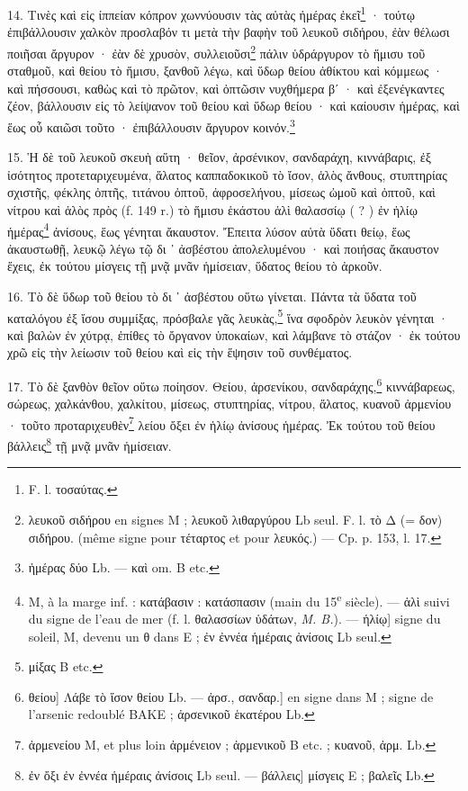 \documentclass[a4paper, 11pt, oneside, polutonikogreek, french]{article}
\begin{document}
14. Τινὲς καὶ εἰς ίππείαν κόπρον χωννύουσιν τὰς αὐτὰς ἠμέρας ἐκεῖ\footnote{F. l. τοσαύτας.} · τούτῳ ἐπιβάλλουσιν χαλκὸν προσλαβόν τι μετὰ τὴν βαφὴν τοῦ λευκοῦ σιδήρου, ἐὰν θέλωσι ποιῆσαι ἄργυρον · ἐὰν δὲ χρυσὸν, συλλειοῦσι\footnote{λευκοῦ σιδήρου en signes M ; λευκοῦ λιθαργύρου Lb seul. F. l. τὸ Δ (= δον) σιδήρου. (même signe pour τέταρτος et pour λευκός.) --- Cp. p. 153, l. 17.} πάλιν ὑδράργυρον τὸ ἥμισυ τοῦ σταθμοῦ, καὶ θείου τὸ ἥμισυ, ξανθοῦ λέγω, καὶ ὕδωρ θείου ἀθίκτου καὶ κόμμεως · καὶ πήσσουσι, καθὼς καὶ τὸ πρῶτον, καὶ ὀπτῶσιν νυχθήμερα βʹ · καὶ ἐξενέγκαντες ζέον, βάλλουσιν εἰς τὸ λείψανον τοῦ θείου καὶ ὕδωρ θείου · καὶ καίουσιν ἡμέρας, καὶ ἕως οὗ καιῶσι τοῦτο · ἐπιβάλλουσιν ἄργυρον κοινόν.\footnote{ἡμέρας δύο Lb. --- καὶ om. B etc.}

15. Ἡ δὲ τοῦ λευκοῦ σκευὴ αὕτη · θεῖον, ἀρσένικον, σανδαράχη, κιννάβαρις, ἐξ ἰσότητος προτεταριχευμένα, ἅλατος καππαδοκικοῦ τὸ ἴσον, ἁλὸς ἄνθους, στυπτηρίας σχιστῆς, φέκλης ὀπτῆς, τιτάνου ὀπτοῦ, ἀφροσελήνου, μίσεως ὠμοῦ καὶ ὀπτοῦ, καὶ νίτρου καὶ ἁλὸς πρὸς (f. 149 r.) τὸ ἥμισυ ἑκάστου ἁλὶ θαλασσίῳ ( ? ) ἐν ἡλίῳ ἡμέρας\footnote{M, à la marge inf. : κατάβασιν : κατάσπασιν (main du 15\textsuperscript{e} siècle). --- ἁλὶ suivi du signe de l'eau de mer (f. l. θαλασσίων ὑδάτων, \emph{M. B.}). --- ἡλίῳ] signe du soleil, M, devenu un θ dans E ; ἐν ἐννέα ἡμέραις ἀνίσοις Lb seul.} ἀνίσους, ἕως γένηται ἄκαυστον. Ἔπειτα λύσον αὐτὰ ὕδατι θείῳ, ἕως ἀκαυστωθῇ, λευκῷ λέγω τῷ δι ᾽ ἀσβέστου ἀπολελυμένου · καὶ ποιήσας ἄκαυστον ἔχεις, ἐκ τούτου μίσγεις τῇ μνᾷ μνᾶν ἡμίσειαν, ὕδατος θείου τὸ ἀρκοῦν.

16. Τὸ δὲ ὕδωρ τοῦ θείου τὸ δι ᾽ ἀσβέστου οὕτω γίνεται. Πάντα τὰ ὕδατα τοῦ καταλόγου ἐξ ἴσου συμμίξας, πρόσβαλε γᾶς λευκὰς,\footnote{μίξας B etc.} ἵνα σφοδρὸν λευκὸν γένηται · καὶ βαλὼν ἐν χύτρᾳ, ἐπίθες τὸ ὄργανον ὑποκαίων, καὶ λάμβανε τὸ στάζον · ἐκ τούτου χρῶ εἰς τὴν λείωσιν τοῦ θείου καὶ εἰς τὴν ἕψησιν τοῦ συνθέματος.

17. Τὸ δὲ ξανθὸν θεῖον οὕτω ποίησον. Θείου, ἀρσενίκου, σανδαράχης,\footnote{θείου] Λάβε τὸ ἴσον θείου Lb. --- ἀρσ., σανδαρ.] en signe dans M ; signe de l'arsenic redoublé BAKE ; ἀρσενικοῦ ἑκατέρου Lb.} κιννάβαρεως, σώρεως, χαλκάνθου, χαλκίτου, μίσεως, στυπτηρίας, νίτρου, ἅλατος, κυανοῦ ἀρμενίου · τοῦτο προταριχευθὲν\footnote{ἀρμενείου M, et plus loin ἀρμένειον ; ἀρμενικοῦ B etc. ; κυανοῦ, ἀρμ. Lb.} λείου ὄξει ἐν ἡλίῳ ἀνίσους ἡμέρας. Ἐκ τούτου τοῦ θείου βάλλεις\footnote{ἐν ὄξι ἐν ἐννέα ἡμέραις ἀνίσοις Lb seul. --- βάλλεις] μίσγεις E ; βαλεῖς Lb.} τῇ μνᾷ μνᾶν ἡμίσειαν.
\end{document}
